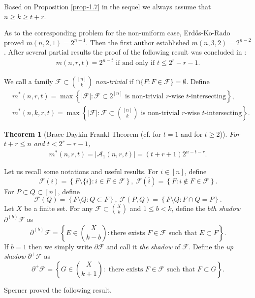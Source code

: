 \documentclass[11pt,a4paper]{article}
\newtheorem{thm}{Theorem}[section]
\newtheorem{false statement}{False statement}
\theoremstyle{definition}
\def\hf{\mathcal{F}}
\def\ha{\mathcal{A}}
\begin{document}
Based on Proposition \ref{prop-1.7} in the sequel we always assume that $n\geq k\geq t+r$.

As to the corresponding problem for the non-uniform case, Erd\H{o}s-Ko-Rado \cite{ekr} proved $m(n,2,1)=2^{n-1}$. Then the first author \cite{F77Bulletin} established $m(n,3,2) = 2^{n-2}$. After several partial results  the proof of the following result was concluded in \cite{F19}:
\begin{align}\label{ineq-1.4}
 m(n,r,t) = 2^{n-t} \mbox{ if and only if } t\leq 2^r-r-1.
\end{align}


We call  a family $\hf\subset \binom{[n]}{k}$ {\it non-trivial} if $\cap \{F\colon F\in \hf\} =\emptyset$. Define
\begin{align*}
&m^*(n,r,t)= \max\left\{|\hf|\colon \hf\subset 2^{[n]} \mbox{ is non-trivial $r$-wise $t$-intersecting}\right\},\\[3pt]
&m^*(n,k,r,t)= \max\left\{|\hf|\colon \hf\subset \binom{[n]}{k} \mbox{ is non-trivial $r$-wise $t$-intersecting}\right\}.
\end{align*}

\begin{thm}[Brace-Daykin-Frankl Theorem (cf. \cite{BD} for $t=1$ and \cite{F91} for $t\geq 2$)]\label{thm-bd}
For $t+r\leq n$ and  $t<2^r-r-1$,
\begin{align}\label{ineq-1.5}
m^*(n,r,t)= |\ha_1(n,r,t)| =(t+r+1) 2^{n-t-r}.
\end{align}
\end{thm}

Let us recall some notations and useful results.
For $i\in [n]$, define
\[
\hf(i) =\left\{F\setminus \{i\}\colon i\in F\in \hf\right\},\ \hf(\bar{i}) = \left\{F\colon i\notin F\in \hf\right\}.
\]
For $P\subset Q\subset [n]$, define
\[
\hf(Q)= \left\{F\setminus Q\colon Q\subset F\right\},\ \hf(P,Q)= \left\{F\setminus Q\colon  F\cap Q=P\right\}.
\]
Let $X$ be a finite set. 
For any $\hf\subset \binom{X}{k}$ and $1\leq b< k$, define the {\it $b$th shadow}  $\partial^{(b)} \hf$ as
\[
\partial^{(b)} \hf =\left\{E\in \binom{X}{k-b}\colon \mbox{there exists }F\in \hf \mbox{ such that }E\subset F\right\}.
\]
If $b=1$ then we simply write $\partial \hf$ and call it {\it the shadow} of $\hf$.
Define the {\it up shadow} $\partial^+ \hf$  as
\[
\partial^+ \hf =\left\{G\in \binom{X}{k+1}\colon \mbox{ there exists } F\in \hf \mbox{ such that  }F\subset G\right\}.
\]

Sperner  \cite{Sperner} proved the following result.
 
\end{document}
